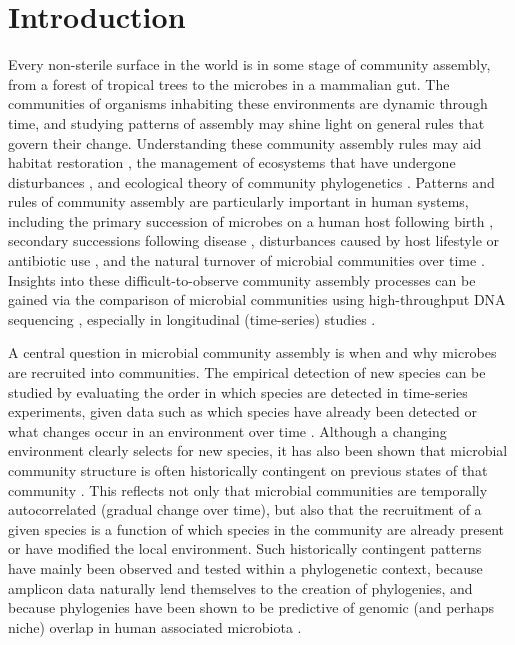 \documentclass{article}
\begin{document}
{\parindent0pt \section{Introduction}} \label{sec:introduction}
Every non-sterile surface in the world is in some stage of community assembly, from a forest of tropical trees to the microbes in a mammalian gut. The communities of organisms inhabiting these environments are dynamic through time, and studying patterns of assembly may shine light on general rules that govern their change. Understanding these community assembly rules may aid habitat restoration \cite{Palmer1997,Temperton2004}, the management of ecosystems that have undergone disturbances \cite{Richards1999,Bengtsson2000}, and ecological theory of community phylogenetics \cite{ODwyer2012,Goberna2014}. Patterns and rules of community assembly are particularly important in human systems, including the primary succession of microbes on a human host following birth \cite{Koenig2011}, secondary successions following disease \cite{Frank2007,David2014}, disturbances caused by host lifestyle or antibiotic use \cite{Peterfreund2012,Kennedy2016,Guittar2019}, and the natural turnover of microbial communities over time \cite{Caporaso2011}. Insights into these difficult-to-observe community assembly processes can be gained via the comparison of microbial communities using high-throughput DNA sequencing \cite{Caporaso2011,Nemergut2013,Nemergut2016}, especially in longitudinal (time-series) studies \cite{Caporaso2011,Koenig2011,Kennedy2016}.
\par
A central question in microbial community assembly is when and why microbes are recruited into communities. The empirical detection of new species can be studied by evaluating the order in which species are detected in time-series experiments, given data such as which species have already been detected or what changes occur in an environment over time \cite{Nemergut2013,Sprockett2018}. Although a changing environment clearly selects for new species, it has also been shown that microbial community structure is often historically contingent on previous states of that community \cite{Nemergut2013,Fukami2015,Sprockett2018,Verster2018,Litvak2019}. This reflects not only that microbial communities are temporally autocorrelated (gradual change over time), but also that the recruitment of a given species is a function of which species in the community are already present or have modified the local environment. Such historically contingent patterns have mainly been observed and tested within a phylogenetic context, because amplicon data naturally lend themselves to the creation of phylogenies, and because phylogenies have been shown to be predictive of genomic (and perhaps niche) overlap in human associated microbiota \cite{Zaneveld2010,Langille2013}.
\end{document}

